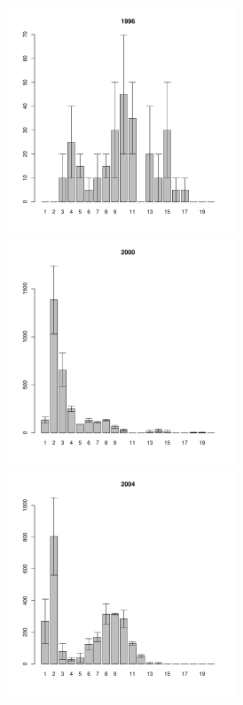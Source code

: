 \documentclass[12pt, a4paper]{article}
\begin{document}
\begin{figure}[h]
\begin{multicols}{3}
\hfill
\includegraphics[width=60mm]{../White_Sea/Ryashkov_ZRS/zrs_1996_.pdf}
\hfill
\includegraphics[width=60mm]{../White_Sea/Ryashkov_ZRS/zrs_2000_.pdf}
\hfill
\includegraphics[width=60mm]{../White_Sea/Ryashkov_ZRS/zrs_2004_.pdf}
\end{multicols}



\end{figure}
\end{document}
